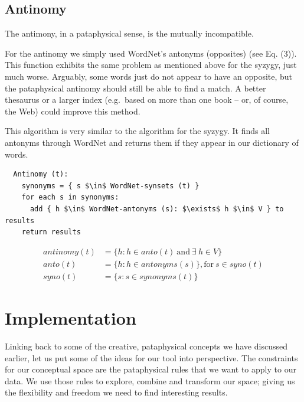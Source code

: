 \subsection{Antinomy}

The antimony, in a pataphysical sense, is the mutually incompatible.

For the antinomy we simply used WordNet’s antonyms (opposites) (see Eq. (3)). This function exhibits the same problem as mentioned above for the syzygy, just much worse.  Arguably, some words just do not appear to have an opposite, but the pataphysical antinomy should still be able to find a match. A better thesaurus or a larger index (e.g.\ based on more than one book – or, of course, the Web) could improve this method.

This algorithm is very similar to the algorithm for the syzygy. It finds all antonyms through WordNet and returns them if they appear in our dictionary of words.

\begin{verbatim}
  Antinomy (t):
    synonyms = { s $\in$ WordNet-synsets (t) }
    for each s in synonyms:
      add { h $\in$ WordNet-antonyms (s): $\exists$ h $\in$ V } to results
    return results
\end{verbatim}

\begin{equation}
  \begin{split}
  antinomy( t ) &= \{ h \colon h \in anto( t ) \ \text{and} \ \exists \ h \in V \}\\%
  anto( t ) &= \{ h \colon h \in antonyms( s ) \}, \text{for} \ s \in syno( t )\\
  syno( t ) &= \{ s \colon s \in synonyms( t ) \}
  \end{split}
\label{eq:antinomy}
\end{equation}







\section{Implementation}

Linking back to some of the creative, pataphysical concepts we have discussed earlier, let us put some of the ideas for our tool into perspective. The constraints for our conceptual space are the pataphysical rules that we want to apply to our data. We use those rules to explore, combine and transform our space; giving us the flexibility and freedom we need to find interesting results.

